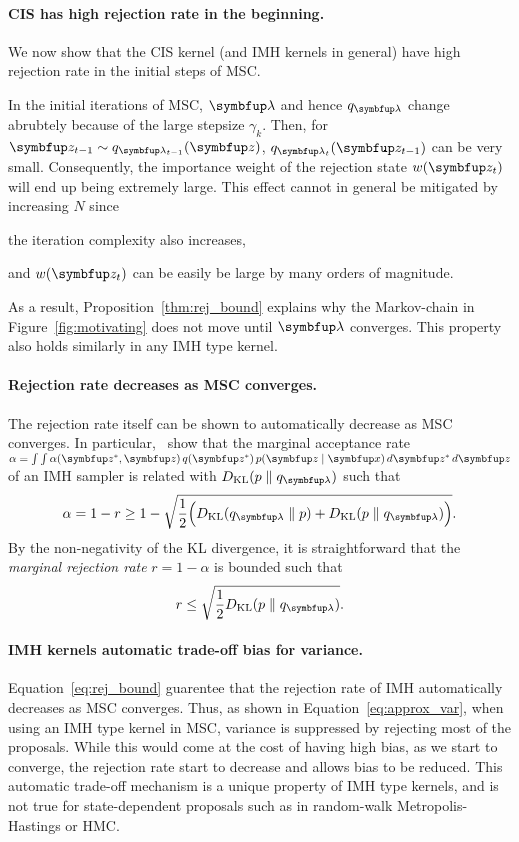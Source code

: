 \paragraph{CIS has high rejection rate in the beginning.}
We now show that the CIS kernel (and IMH kernels in general) have high rejection rate in the initial steps of MSC.
%

%
In the initial iterations of MSC, \(\vlambda\) and hence \(q_{\vlambda}\) change abrubtely because of the large stepsize \(\gamma_k\).
Then, for \(\vz_{t-1} \sim q_{\vlambda_{t-1}}(\vz)\), \(q_{\vlambda_t}(\vz_{t-1})\) can be very small.
Consequently, the importance weight of the rejection state \(w(\vz_t)\) will end up being extremely large.
This effect cannot in general be mitigated by increasing \(N\) since
\begin{enumerate*}[label=(\roman*)]
  \item the iteration complexity also increases,
  \item and \(w(\vz_t)\) can be easily be large by many orders of magnitude.
\end{enumerate*}
As a result, Proposition~\ref{thm:rej_bound} explains why the Markov-chain in Figure~\ref{fig:motivating} does not move until \(\vlambda\) converges.
This property also holds similarly in any IMH type kernel.

\paragraph{Rejection rate decreases as MSC converges.}
The rejection rate itself can be shown to automatically decrease as MSC converges.
In particular,~\citet[Theorem 1]{neklyudov_metropolishastings_2019} show that the marginal acceptance rate \(\alpha = \int \int \alpha(\vz^*,\vz)\,q(\vz^*)\,p(\vz\mid\vx)\,d\vz^*\,d\vz \) of an IMH sampler is related with \(\DKL{p}{q_{\vlambda}}\) such that
\begin{align}
    \alpha = 1 - r \geq 1 - \sqrt{
      \frac{1}{2} \Big(
      \DKL{q_{\vlambda}}{p} + \DKL{p}{q_{\vlambda}}
      \Big)
    }.
\end{align}
By the non-negativity of the KL divergence, it is straightforward that the \textit{marginal rejection rate} \(r=1 - \alpha\) is bounded such that
\begin{align}
  r
  \leq 
  \sqrt{ \frac{1}{2}
    \DKL{p}{q_{\vlambda}}
  }.\label{eq:rej_bound}
\end{align}

\paragraph{IMH kernels automatic trade-off bias for variance.}
Equation~\eqref{eq:rej_bound} guarentee that the rejection rate of IMH automatically decreases as MSC converges.
Thus, as shown in Equation~\eqref{eq:approx_var}, when using an IMH type kernel in MSC, variance is suppressed by rejecting most of the proposals.
While this would come at the cost of having high bias, as we start to converge, the rejection rate start to decrease and allows bias to be reduced.
This automatic trade-off mechanism is a unique property of IMH type kernels, and is not true for state-dependent proposals such as in random-walk Metropolis-Hastings or HMC.

